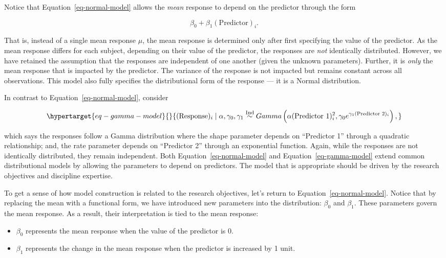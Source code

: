 \documentclass[
  letterpaper,
  DIV=11,
  numbers=noendperiod]{scrreprt}
\providecommand{\tightlist}{%
  \setlength{\itemsep}{0pt}\setlength{\parskip}{0pt}}\usepackage{longtable,booktabs,array}
\theoremstyle{definition}
\theoremstyle{plain}
\theoremstyle{definition}
\theoremstyle{remark}
\begin{document}
Notice that Equation~\ref{eq-normal-model} allows the \emph{mean}
response to depend on the predictor through the form

\[\beta_0 + \beta_1 (\text{Predictor})_i.\]

That is, instead of a single mean response \(\mu\), the mean response is
determined only after first specifying the value of the predictor. As
the mean response differs for each subject, depending on their value of
the predictor, the responses are \emph{not} identically distributed.
However, we have retained the assumption that the responses are
independent of one another (given the unknown parameters). Further, it
is \emph{only} the mean response that is impacted by the predictor. The
variance of the response is not impacted but remains constant across all
observations. This model also fully specifies the distributional form of
the response --- it is a Normal distribution.

In contrast to Equation~\ref{eq-normal-model}, consider

\begin{equation}\protect\hypertarget{eq-gamma-model}{}{(\text{Response})_i \mid \alpha, \gamma_0, \gamma_1 \stackrel{\text{Ind}}{\sim}Gamma\left(\alpha (\text{Predictor 1})_i^2, \gamma_0e^{\gamma_1 (\text{Predictor 2})_i}\right),}\label{eq-gamma-model}\end{equation}

which says the responses follow a Gamma distribution where the shape
parameter depends on ``Predictor 1'' through a quadratic relationship;
and, the rate parameter depends on ``Predictor 2'' through an
exponential function. Again, while the responses are not identically
distributed, they remain independent. Both
Equation~\ref{eq-normal-model} and Equation~\ref{eq-gamma-model} extend
common distributional models by allowing the parameters to depend on
predictors. The model that is appropriate should be driven by the
research objectives and discipline expertise.

To get a sense of how model construction is related to the research
objectives, let's return to Equation~\ref{eq-normal-model}. Notice that
by replacing the mean with a functional form, we have introduced new
parameters into the distribution: \(\beta_0\) and \(\beta_1\). These
parameters govern the mean response. As a result, their interpretation
is tied to the mean response:

\begin{itemize}
\tightlist
\item
  \(\beta_0\) represents the mean response when the value of the
  predictor is 0.
\item
  \(\beta_1\) represents the change in the mean response when the
  predictor is increased by 1 unit.
\end{itemize}
\end{document}
